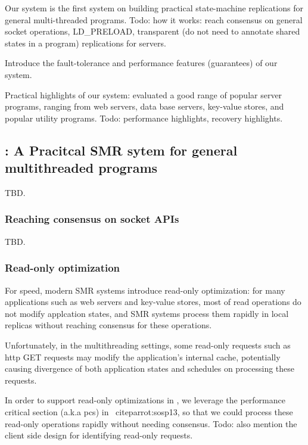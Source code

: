 Our system is the first system on building practical state-machine 
replications for general multi-threaded programs. Todo: how it works: reach 
consensus on general socket operations, LD\_PRELOAD, transparent (do not need 
to annotate shared states in a program) replications for servers.

Introduce the fault-tolerance and performance features (guarantees) of our 
system.

Practical highlights of our system: evaluated a good range of popular server 
programs, ranging from web servers, data base servers, key-value stores, and 
popular utility programs. Todo: performance highlights, recovery highlights.

\subsection{\msmr: A Pracitcal SMR sytem for general multithreaded programs} \label{sec:replication-msmr}
TBD.

\subsubsection{Reaching consensus on socket APIs} \label{sec:replication-msmr-consensus}
TBD.

\subsubsection{Read-only optimization} \label{sec:replication-msmr-readonly}
For speed, modern SMR systems introduce read-only optimization: for many applications such as web servers and key-value stores,
 most of read operations do not modify applcation states, and SMR systems process them rapidly in 
local replicas without reaching consensus for these operations.

Unfortunately, in the multithreading settings, some read-only requests such as http GET requests may
modify the application's internal cache, potentially causing divergence of both application states and 
schedules on processing these requests.

In order to support read-only optimizations in \msmr, we leverage the performance critical 
section (a.k.a pcs) in \parrot~cite{parrot:sosp13}, so that we could process 
these read-only operations rapidly without needing consensus. Todo: also 
mention the client side design for identifying read-only requests.

